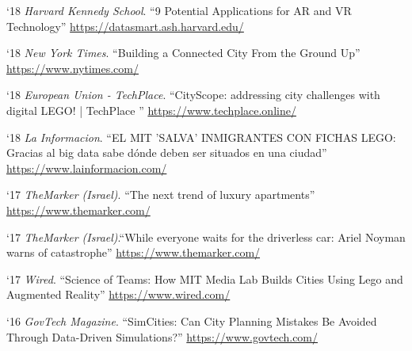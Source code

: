 \begin{tablist}
    \item[`18] \tab \textit{Harvard Kennedy School}. \enquote{9 Potential Applications for AR and VR Technology}
    \href{https://datasmart.ash.harvard.edu/news/article/9-potential-applications-ar-and-vr-technology}{https://datasmart.ash.harvard.edu/}

    \item[`18] \tab \textit{New York Times}. \enquote{Building a Connected City From the Ground Up}
    \href{https://www.nytimes.com/2018/04/03/business/smart-city.html}{https://www.nytimes.com/}

    \item[`18] \tab \textit{European Union - TechPlace}. \enquote{CityScope: addressing city challenges with digital LEGO! | TechPlace }
    \href{https://www.techplace.online/cityscope-addressing-city-challenges-with-digital-lego/}{https://www.techplace.online/}

    \item[`18] \tab \textit{La Informacion}. \enquote{EL MIT 'SALVA' INMIGRANTES CON FICHAS LEGO: Gracias al big data sabe dónde deben ser situados en una ciudad} \href{https://www.lainformacion.com/tecnologia/el-mit-salva-inmigrantes-con-fichas-lego-gracias-al-big-data-sabe-donde-deben-ser-situados-en-una-ciudad/6351916/}{https://www.lainformacion.com/}

    \item[`17] \tab \textit{TheMarker (Israel)}. \enquote{The next trend of luxury apartments}
    \href{https://www.themarker.com/realestate/1.4456551}{https://www.themarker.com/}

    \item[`17] \tab \textit{TheMarker (Israel)}.\enquote{While everyone waits for the driverless car: Ariel Noyman warns of catastrophe}
    \href{https://www.themarker.com/markerweek/1.4008478}{https://www.themarker.com/}

    \item[`17] \tab \textit{Wired}. \enquote{Science of Teams: How MIT Media Lab Builds Cities Using Lego and Augmented Reality}
    \href{https://www.wired.com/video/watch/science-of-teams-mit-media-lab}{https://www.wired.com/}

    \item[`16] \tab \textit{GovTech Magazine}. \enquote{SimCities: Can City Planning Mistakes Be Avoided Through Data-Driven Simulations?}
    \href{https://www.govtech.com/data/SimCities-Can-City-Planning-Mistakes-Be-Avoided-Through-Data-Driven-Simulations.html}{https://www.govtech.com/}


\end{tablist}
